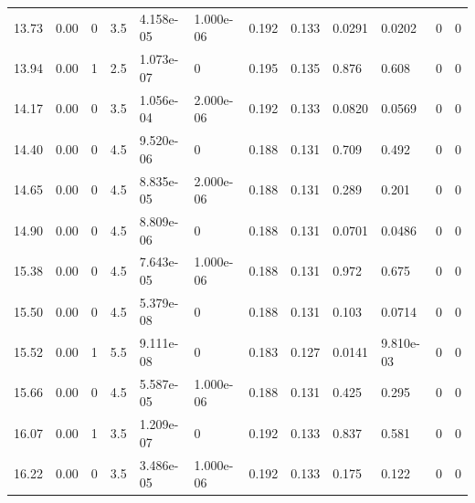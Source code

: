 \documentclass[preview]{standalone}
\begin{document}
{{\begin{tabular}{L{1.2cm}C{1.2cm} C{0.3cm}C{0.5cm} C{1.4cm}C{1.4cm} C{1.4cm}C{1.4cm} C{1.6cm}C{1.6cm} C{1.6cm}C{1.6cm}}
  13.73  &  0.00  & 0     & 3.5 &  4.158e-05  & 1.000e-06  &  0.192&   0.133& 0.0291 & 0.0202   &  0 & 0  \\ 
  13.94  &  0.00  & 1     & 2.5 &  1.073e-07  & 0  &  0.195&   0.135& 0.876 & 0.608   &  0 & 0  \\ 
  14.17  &  0.00  & 0     & 3.5 &  1.056e-04  & 2.000e-06  &  0.192&   0.133& 0.0820 & 0.0569   &  0 & 0  \\ 
  14.40  &  0.00  & 0     & 4.5 &  9.520e-06  & 0  &  0.188&   0.131& 0.709 & 0.492   &  0 & 0  \\ 
  14.65  &  0.00  & 0     & 4.5 &  8.835e-05  & 2.000e-06  &  0.188&   0.131& 0.289 & 0.201   &  0 & 0  \\ 
  14.90  &  0.00  & 0     & 4.5 &  8.809e-06  & 0  &  0.188&   0.131& 0.0701 & 0.0486   &  0 & 0  \\ 
  15.38  &  0.00  & 0     & 4.5 &  7.643e-05  & 1.000e-06  &  0.188&   0.131& 0.972 & 0.675   &  0 & 0  \\ 
  15.50  &  0.00  & 0     & 4.5 &  5.379e-08  & 0  &  0.188&   0.131& 0.103 & 0.0714   &  0 & 0  \\ 
  15.52  &  0.00  & 1     & 5.5 &  9.111e-08  & 0  &  0.183&   0.127& 0.0141 & 9.810e-03   &  0 & 0  \\ 
  15.66  &  0.00  & 0     & 4.5 &  5.587e-05  & 1.000e-06  &  0.188&   0.131& 0.425 & 0.295   &  0 & 0  \\ 
  16.07  &  0.00  & 1     & 3.5 &  1.209e-07  & 0  &  0.192&   0.133& 0.837 & 0.581   &  0 & 0  \\ 
  16.22  &  0.00  & 0     & 3.5 &  3.486e-05  & 1.000e-06  &  0.192&   0.133& 0.175 & 0.122   &  0 & 0  \\ 
\hline 
\end{tabular} 

}}
\end{document}
